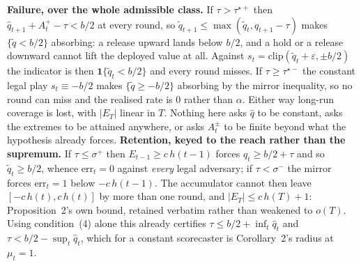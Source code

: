 \textbf{Failure, over the whole admissible class.} If $\tau > \tau^{\star+}$ then $\hat{q}_{t+1} +
A^{+}_t - \tau < b/2$ at every round, so $\tilde{q}_{t+1} \le \max(\tilde{q}_t, q_{t+1}-\tau)$
makes $\{\tilde{q} < b/2\}$ absorbing: a release upward lands below $b/2$, and a hold or a
release downward cannot lift the deployed value at all. Against $s_t =
\mathrm{clip}(\tilde{q}_t+\varepsilon,\pm b/2)$ the indicator is then $\mathbf{1}\{\tilde{q}_t <
b/2\}$ and every round misses. If $\tau \ge \tau^{\star-}$ the constant legal play $s_t \equiv
-b/2$ makes $\{\tilde{q} \ge -b/2\}$ absorbing by the mirror inequality, so no round can miss and
the realised rate is $0$ rather than $\alpha$.
Either way long-run coverage is lost, with $|E_T|$ linear in $T$. Nothing
here asks $\hat{q}$ to be constant, asks the extremes to be attained anywhere, or asks $A^{\pm}_t$
to be finite beyond what the hypothesis already forces. \textbf{Retention, keyed to the reach
rather than the supremum.} If $\tau \le \sigma^{+}$ then $E_{t-1} \ge c\,h(t-1)$ forces $q_t \ge
b/2+\tau$ and so $\tilde{q}_t \ge b/2$, whence $\mathrm{err}_t = 0$ against \emph{every} legal
adversary; if $\tau < \sigma^{-}$ the mirror forces $\mathrm{err}_t = 1$ below $-c\,h(t-1)$. The
accumulator cannot then leave $[-c\,h(t),c\,h(t)]$ by more than one round, and $|E_T| \le
c\,h(T)+1$: Proposition~2's own bound, retained verbatim rather than weakened to $o(T)$. Using
condition~(4) alone this already certifies $\tau \le b/2+\inf_t\hat{q}_t$ and $\tau < b/2 -
\sup_t\hat{q}_t$, which for a constant scorecaster is Corollary~2's radius at $\mu_t = 1$.

